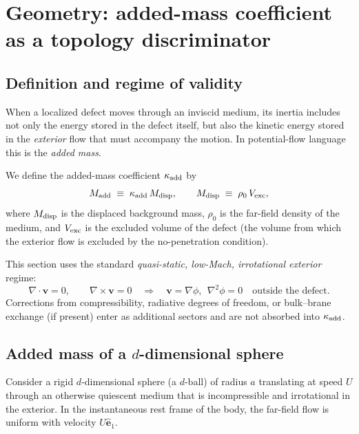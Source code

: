 \documentclass[11pt]{article}
\begin{document}
\section{Geometry: added-mass coefficient as a topology discriminator}
\label{sec:added_mass}

\subsection{Definition and regime of validity}

When a localized defect moves through an inviscid medium, its inertia includes not only the energy stored in the defect itself, but also the kinetic energy stored in the \emph{exterior} flow that must accompany the motion.  In potential-flow language this is the \emph{added mass}.

We define the added-mass coefficient \(\kappa_{\rm add}\) by
\begin{equation}
  M_{\rm add} \;\equiv\; \kappa_{\rm add}\,M_{\rm disp},
  \qquad
  M_{\rm disp} \;\equiv\; \rho_0\,V_{\rm exc},
\end{equation}
where \(M_{\rm disp}\) is the displaced background mass, \(\rho_0\) is the far-field density of the medium, and \(V_{\rm exc}\) is the excluded volume of the defect (the volume from which the exterior flow is excluded by the no-penetration condition).

This section uses the standard \emph{quasi-static, low-Mach, irrotational exterior} regime:
\begin{equation}
  \nabla\cdot \mathbf v = 0, \qquad \nabla\times \mathbf v = 0
  \quad\Rightarrow\quad \mathbf v = \nabla\phi,\ \ \nabla^2\phi=0
  \quad \text{outside the defect.}
\end{equation}
Corrections from compressibility, radiative degrees of freedom, or bulk--brane exchange (if present) enter as additional sectors and are not absorbed into \(\kappa_{\rm add}\).

\subsection{Added mass of a \texorpdfstring{\(d\)}{d}-dimensional sphere}

Consider a rigid \(d\)-dimensional sphere (a \(d\)-ball) of radius \(a\) translating at speed \(U\) through an otherwise quiescent medium that is incompressible and irrotational in the exterior.  In the instantaneous rest frame of the body, the far-field flow is uniform with velocity \(U\hat{\mathbf e}_1\).
\end{document}
